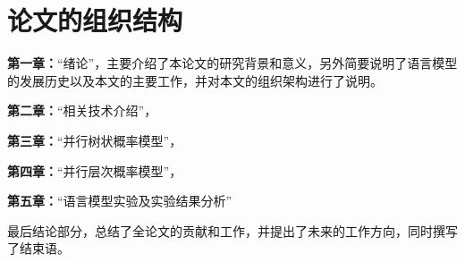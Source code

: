 \section{论文的组织结构}
\textbf{第一章：}``绪论''，主要介绍了本论文的研究背景和意义，另外简要说明了语言模型的发展历史以及本文的主要工作，并对本文的组织架构进行了说明。

\textbf{第二章：}``相关技术介绍''，

\textbf{第三章：}``并行树状概率模型''，


\textbf{第四章：}``并行层次概率模型''，

\textbf{第五章：}``语言模型实验及实验结果分析''

最后结论部分，总结了全论文的贡献和工作，并提出了未来的工作方向，同时撰写了结束语。



